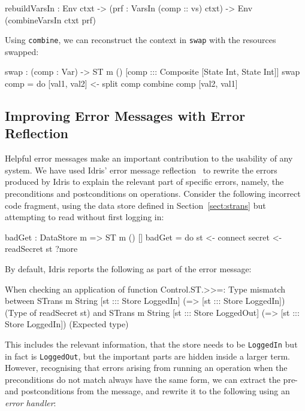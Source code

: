 \small
\begin{code}
rebuildVarsIn : Env ctxt -> (prf : VarsIn (comp :: vs) ctxt) -> 
                Env (combineVarsIn ctxt prf)
\end{code}
\normalsize

Using \texttt{combine}, we can reconstruct the context in \texttt{swap} with
the resources swapped:

\small
\begin{code}
swap : (comp : Var) -> ST m () [comp ::: Composite [State Int, State Int]]
swap comp = do [val1, val2] <- split comp
               combine comp [val2, val1]
\end{code}
\normalsize

\subsection{Improving Error Messages with Error Reflection}

\label{sect:errorreflection}

Helpful error messages make an important contribution to the usability of any
system. We have used Idris' error message reflection~\citep{christiansen-thesis}
to rewrite the errors produced by Idris to explain the relevant part of
specific errors, namely, the preconditions and postconditions on operations.
Consider the following incorrect code fragment, using the data store defined
in Section~\ref{sect:strans} but attempting to read without first logging in:

\small
\begin{code}
badGet : DataStore m => ST m () []
badGet = do st <- connect
            secret <- readSecret st
            ?more
\end{code}
\normalsize

By default, Idris reports the following as part of the error message:

\small
\begin{code}
When checking an application of function Control.ST.>>=:
        Type mismatch between
                STrans m String [st ::: Store LoggedIn]
                       (\result =>
                          [st ::: Store LoggedIn]) (Type of readSecret st)
        and     STrans m String [st ::: Store LoggedOut]
                       (\result => [st ::: Store LoggedIn]) (Expected type)
\end{code}
\normalsize

This includes the relevant information, that the store needs to be
\texttt{LoggedIn} but in fact is \texttt{LoggedOut}, but the important parts
are hidden inside a larger term. However, recognising that errors arising
from running an operation when the preconditions do not match always have
the same form, we can extract the pre- and postconditions from the message,
and rewrite it to the following using an \emph{error handler}:

